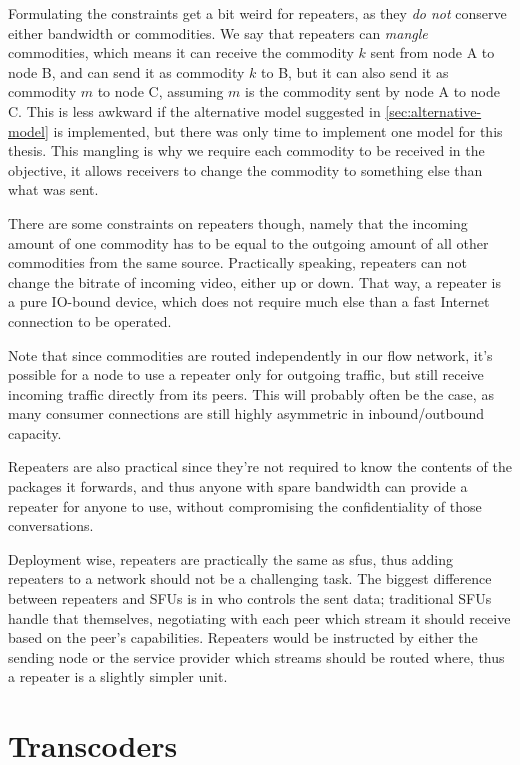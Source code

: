 Formulating the constraints get a bit weird for repeaters, as they \emph{do not} conserve either bandwidth or commodities. We say that repeaters can \emph{mangle} commodities, which means it can receive the commodity $k$ sent from node A to node B, and can send it as commodity $k$ to B, but it can also send it as commodity $m$ to node C, assuming $m$ is the commodity sent by node A to node C. This is less awkward if the alternative model suggested in \autoref{sec:alternative-model} is implemented, but there was only time to implement one model for this thesis. This mangling is why we require each commodity to be received in the objective, it allows receivers to change the commodity to something else than what was sent.

There are some constraints on repeaters though, namely that the incoming amount of one commodity has to be equal to the outgoing amount of all other commodities from the same source. Practically speaking, repeaters can not change the bitrate of incoming video, either up or down. That way, a repeater is a pure IO-bound device, which does not require much else than a fast Internet connection to be operated.

Note that since commodities are routed independently in our flow network, it's possible for a node to use a repeater only for outgoing traffic, but still receive incoming traffic directly from its peers. This will probably often be the case, as many consumer connections are still highly asymmetric in inbound/outbound capacity.

Repeaters are also practical since they're not required to know the contents of the packages it forwards, and thus anyone with spare bandwidth can provide a repeater for anyone to use, without compromising the confidentiality of those conversations.

Deployment wise, repeaters are practically the same as \glspl{sfu}, thus adding repeaters to a network should not be a challenging task. The biggest difference between repeaters and SFUs is in who controls the sent data; traditional SFUs handle that themselves, negotiating with each peer which stream it should receive based on the peer's capabilities. Repeaters would be instructed by either the sending node or the service provider which streams should be routed where, thus a repeater is a slightly simpler unit.


\section{Transcoders}

